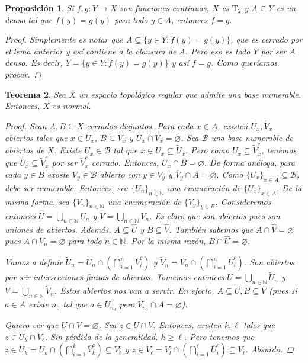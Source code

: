 \documentclass[12pt]{book}
\newtheorem{teo}{Teorema}[section]
\newtheorem{prop}[teo]{Proposición}
\theoremstyle{definition}
\newcommand{\NN}{\mathbb{N}}
\let\emptyset\varnothing
\begin{document}
\begin{prop}
Si $f,g:Y\to X$ son funciones continuas, $X$ es $\mathrm{T}_2$ y $A\subseteq Y$ es un denso tal que $f(y)=g(y)$ para todo $y\in A$, entonces $f=g$.
\begin{proof}
Simplemente es notar que $A\subseteq \{y\in Y : f(y)=g(y)\}$, que es cerrado por el lema anterior y así contiene a la clausura de $A$. Pero eso es todo $Y$ por ser $A$ denso. Es decir, $Y = \{y\in Y : f(y)=g(y)\}$ y así $f=g$. Como queríamos probar.
\end{proof}
\end{prop}

\begin{teo}
Sea $X$ un espacio topológico regular que admite una base numerable. Entonces, $X$ es normal.
\begin{proof}
Sean $A,B\subseteq X$ cerrados disjuntos. Para cada $x\in A$, existen $\tilde{U}_x, \tilde{V}_x$ abiertos tales que $x\in \tilde{U}_x$, $B\subseteq \tilde{V}_x$ y $\tilde{U}_x\cap\tilde{V}_x = \emptyset$. Sea $\mathscr{B}$ una base numerable de abiertos de $X$. Existe $U_x\in\mathscr{B}$ tal que $x\in U_x\subseteq \tilde{U}_x$. Pero como $U_x\subseteq \tilde{V}_x^c$, tenemos que $\overline{U_x}\subseteq \tilde{V}_x^c$ por ser $\tilde{V}_x^c$ cerrado. Entonces, $\overline{U}_x\cap B = \emptyset$. De forma análoga, para cada $y\in B$ exoste $V_y\in\mathscr{B}$ abierto con $y\in V_y$ y $\overline{V}_y\cap A = \emptyset$. Como $\{U_x\}_{x\in A}\subseteq \mathscr{B}$, debe ser numerable. Entonces, sea $\{U_n\}_{n\in\NN}$ una enumeración de $\{U_x\}_{x\in A}$. De la misma forma, sea $\{V_n\}_{n\in\NN}$ una enumeración de $\{V_y\}_{y\in B}$. Consideremos entonces $\hat{U} = \displaystyle\bigcup_{n\in\NN} U_n$ y $\hat{V} = \displaystyle\bigcup_{n\in\NN} V_n$. Es claro que son abiertos pues son uniones de abiertos. Además, $A\subseteq\hat{U}$ y $B\subseteq\hat{V}$. También sabemos que $A\cap\hat{V}=\emptyset$ pues $A\cap V_n=\emptyset$ para todo $n\in\NN$. Por la misma razón, $B\cap\hat{U} = \emptyset$. 

Vamos a definir $\tilde{U}_n = U_n \cap \left(\displaystyle\bigcap_{i=1}^n \overline{V}_i^c\right)$ y $\tilde{V}_n = V_n \cap \left(\displaystyle\bigcap_{i=1}^n \overline{U}_i^c\right)$. Son abiertos por ser intersecciones finitas de abiertos. Tomemos entonces $U=\displaystyle\bigcup_{n\in\NN}\tilde{U}_n$ y $V = \displaystyle\bigcup_{n\in\NN}\tilde{V}_n$. Estos abiertos nos van a servir. En efecto, $A\subseteq U, B\subseteq V$ (pues si $a\in A$ existe $n_0$ tal que $a\in U_{n_0}$ pero $\overline{V}_{n_0}\cap A = \emptyset$).

Quiero ver que $U\cap V = \emptyset$. Sea $z\in U\cap V$. Entonces, existen $k,\ell$ tales que $z\in \tilde{U}_k\cap \tilde{V}_\ell$. Sin pérdida de la generalidad, $k\geq \ell$. Pero tenemos que $z\in \tilde{U}_k = U_k \cap \left(\displaystyle\bigcap_{i=1}^k \overline{V}_k^c\right)\subseteq V_\ell^c$ y $z\in \tilde{V}_\ell = V_l \cap \left(\displaystyle\bigcap_{i=1}^\ell \overline{U}_i^c\right) \subseteq V_\ell$. Absurdo.
\end{proof}
\end{teo}
\end{document}
